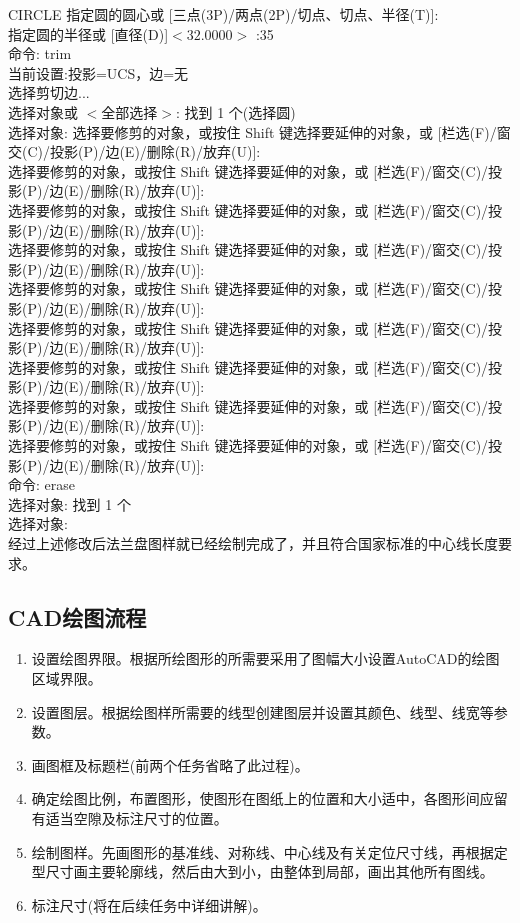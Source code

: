 \noindent
CIRCLE 指定圆的圆心或 [三点(3P)/两点(2P)/切点、切点、半径(T)]:\\
指定圆的半径或 [直径(D)]$<32.0000>$ :35\\
命令: trim\\
当前设置:投影=UCS，边=无\\
选择剪切边...\\
选择对象或 $<$全部选择$>$:  找到 1 个(选择圆)\\
选择对象:
选择要修剪的对象，或按住 Shift 键选择要延伸的对象，或
[栏选(F)/窗交(C)/投影(P)/边(E)/删除(R)/放弃(U)]:\\
选择要修剪的对象，或按住 Shift 键选择要延伸的对象，或
[栏选(F)/窗交(C)/投影(P)/边(E)/删除(R)/放弃(U)]:\\
选择要修剪的对象，或按住 Shift 键选择要延伸的对象，或
[栏选(F)/窗交(C)/投影(P)/边(E)/删除(R)/放弃(U)]:\\
选择要修剪的对象，或按住 Shift 键选择要延伸的对象，或
[栏选(F)/窗交(C)/投影(P)/边(E)/删除(R)/放弃(U)]:\\
选择要修剪的对象，或按住 Shift 键选择要延伸的对象，或
[栏选(F)/窗交(C)/投影(P)/边(E)/删除(R)/放弃(U)]: \\
选择要修剪的对象，或按住 Shift 键选择要延伸的对象，或
[栏选(F)/窗交(C)/投影(P)/边(E)/删除(R)/放弃(U)]:\\
选择要修剪的对象，或按住 Shift 键选择要延伸的对象，或
[栏选(F)/窗交(C)/投影(P)/边(E)/删除(R)/放弃(U)]:\\
选择要修剪的对象，或按住 Shift 键选择要延伸的对象，或
[栏选(F)/窗交(C)/投影(P)/边(E)/删除(R)/放弃(U)]:\\
选择要修剪的对象，或按住 Shift 键选择要延伸的对象，或
[栏选(F)/窗交(C)/投影(P)/边(E)/删除(R)/放弃(U)]:\\
命令: erase\\
选择对象: 找到 1 个\\
选择对象:\\

\indent
经过上述修改后法兰盘图样就已经绘制完成了，并且符合国家标准的中心线长度要求。
\subsection{CAD绘图流程}
\begin{enumerate}
\item 设置绘图界限。根据所绘图形的所需要采用了图幅大小设置AutoCAD的绘图区域界限。
\item 设置图层。根据绘图样所需要的线型创建图层并设置其颜色、线型、线宽等参数。
\item 画图框及标题栏(前两个任务省略了此过程)。
\item 确定绘图比例，布置图形，使图形在图纸上的位置和大小适中，各图形间应留有适当空隙及标注尺寸的位置。
\item 绘制图样。先画图形的基准线、对称线、中心线及有关定位尺寸线，再根据定型尺寸画主要轮廓线，然后由大到小，由整体到局部，画出其他所有图线。
\item 标注尺寸(将在后续任务中详细讲解)。
\end{enumerate}
